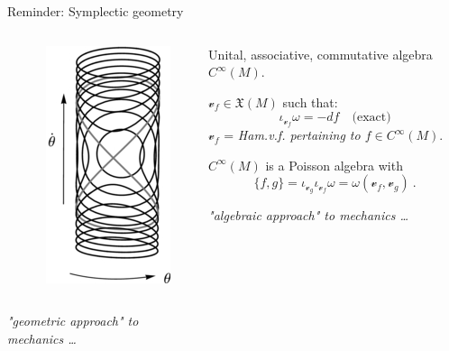\documentclass[handout,10pt]{beamer}
\begin{document}
\begin{frame}{Reminder: Symplectic geometry}
\begin{columns}[T]
\begin{column}{.50\linewidth}
\begin{columns}
\begin{column}{.50\linewidth}
\begin{center}
				\end{center}
			\end{column}	
			\begin{column}{.50\linewidth}
				\begin{center}
					\includegraphics[width=0.45\linewidth]{Pictures/pendulum-phase-space}			
				\end{center}
			\end{column}	
		\end{columns}
		\vfill
		\centering
		\textit{ "geometric approach" to mechanics \dots}
		\endminipage
	\end{column}
	\vrule{}
	\pause
	\begin{column}{.50\linewidth}
		\minipage[c][0.9\textheight][s]{\columnwidth}
		\begin{defblock}
			Unital, associative, commutative algebra $C^\infty(M)$.
		\end{defblock}
		\vfill
		\pause
		\begin{defblock}
			$\mathscr{v}_f \in \mathfrak{X}(M)$ such that:
			$$\iota_{\mathscr{v}_f} \omega = -df \quad \text{(exact)}$$ %
			\small$\mathscr{v}_f$ = \emph{Ham.v.f. pertaining to $f\in C^\infty(M)$}.
		\end{defblock}
		\begin{defblock}
			$C^\infty(M)$ is a Poisson algebra with
			$$\{f,g\} = \iota_{\mathscr{v}_g} \iota_{\mathscr{v}_f} \omega = \omega(\mathscr{v}_f,\mathscr{v}_g) ~.$$
		\end{defblock}
		\vfill
		\centering
		\textit{ "algebraic approach" to mechanics \dots}
		\endminipage
	\end{column}
\end{columns}
\end{frame}
\end{document}
